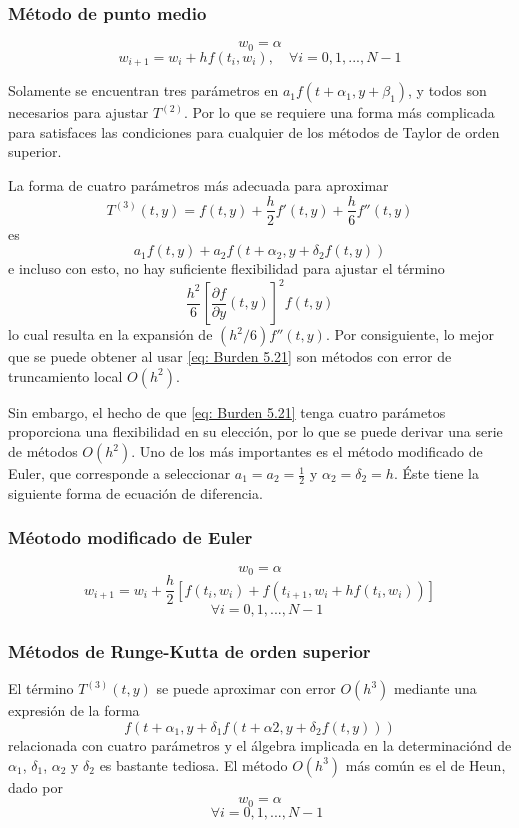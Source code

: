 \subsubsection{Método de punto medio}
\[ w_0 = \alpha \]
\[ w_{i + 1} = w_i + h f(t_i, w_i), \quad \forall i = 0, 1, ..., N - 1 \]

Solamente se encuentran tres parámetros en $a_1 f(t + \alpha_1, y + \beta_1)$, y todos son necesarios para ajustar $T^{(2)}$. Por lo que se requiere una forma más complicada para satisfaces las condiciones para cualquier de los métodos de Taylor de orden superior.

La forma de cuatro parámetros más adecuada para aproximar
\[ T^{(3)} (t, y) = f(t, y) + \frac{h}{2} f'(t,y) + \frac{h}{6} f''(t, y) \]
es
\begin{equation}
    \label{eq: Burden 5.21}
    a_1 f(t, y) + a_2 f(t + \alpha_2, y + \delta_2 f(t, y))
\end{equation}
e incluso con esto, no hay suficiente flexibilidad para ajustar el término
\[ \frac{h^2}{6} \left[ \frac{\partial f}{\partial y} (t, y) \right]^2 f(t, y) \]
lo cual resulta en la expansión de $(h^2/6) f''(t, y)$. Por consiguiente, lo mejor que se puede obtener al usar \ref{eq: Burden 5.21} son métodos con error de truncamiento local $O(h^2)$.

Sin embargo, el hecho de que \ref{eq: Burden 5.21} tenga cuatro parámetos proporciona una flexibilidad en su elección, por lo que se puede derivar una serie de métodos $O(h^2)$. Uno de los más importantes es el método modificado de Euler, que corresponde a seleccionar $a_1 = a_2 = \frac{1}{2}$ y $\alpha_2 = \delta_2 = h$. Éste tiene la siguiente forma de ecuación de diferencia.

\subsubsection{Méotodo modificado de Euler}
\[ w_0 = \alpha \]
\[ w_{i + 1} = w_i + \frac{h}{2} \left[ f(t_i, w_i) + f(t_{i + 1}, w_i + hf(t_i, w_i)) \right]\]
\[ \quad \forall i = 0, 1, ..., N - 1 \]

\subsubsection{Métodos de Runge-Kutta de orden superior}
El término $T^{(3)}(t, y)$ se puede aproximar con error $O(h^3)$ mediante una expresión de la forma
\[ f(t + \alpha_1, y + \delta_1 f(t + \alpha 2, y + \delta_2 f(t, y))) \]
relacionada con cuatro parámetros y el álgebra implicada en la determinaciónd de $\alpha_1$, $\delta_1$, $\alpha_2$ y $\delta_2$ es bastante tediosa. El método $O(h^3)$ más común es el de Heun, dado por 
\[ w_0 = \alpha \]
\[ \quad \forall i = 0, 1, ..., N - 1 \]

